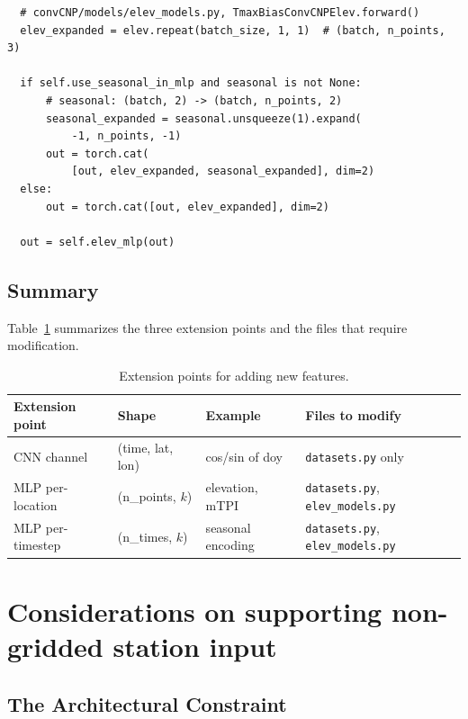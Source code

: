 \begin{enumerate}
\begin{verbatim}
  # convCNP/models/elev_models.py, TmaxBiasConvCNPElev.forward()
  elev_expanded = elev.repeat(batch_size, 1, 1)  # (batch, n_points, 3)

  if self.use_seasonal_in_mlp and seasonal is not None:
      # seasonal: (batch, 2) -> (batch, n_points, 2)
      seasonal_expanded = seasonal.unsqueeze(1).expand(
          -1, n_points, -1)
      out = torch.cat(
          [out, elev_expanded, seasonal_expanded], dim=2)
  else:
      out = torch.cat([out, elev_expanded], dim=2)

  out = self.elev_mlp(out)
\end{verbatim}
\end{enumerate}

\subsection{Summary}

Table~\ref{tab:extension-points} summarizes the three extension points and the files that require modification.

\begin{table}[ht]
\centering
\caption{Extension points for adding new features.}
\label{tab:extension-points}
\begin{tabular}{@{}llll@{}}
\toprule
\textbf{Extension point} & \textbf{Shape} & \textbf{Example} & \textbf{Files to modify} \\
\midrule
CNN channel        & (time, lat, lon)    & cos/sin of doy       & \texttt{datasets.py} only \\
MLP per-location   & (n\_points, $k$)    & elevation, mTPI      & \texttt{datasets.py}, \texttt{elev\_models.py} \\
MLP per-timestep   & (n\_times, $k$)     & seasonal encoding    & \texttt{datasets.py}, \texttt{elev\_models.py} \\
\bottomrule
\end{tabular}
\end{table}

\section{Considerations on supporting non-gridded station input}
\label{sec:out-of-grid}

\subsection{The Architectural Constraint}

